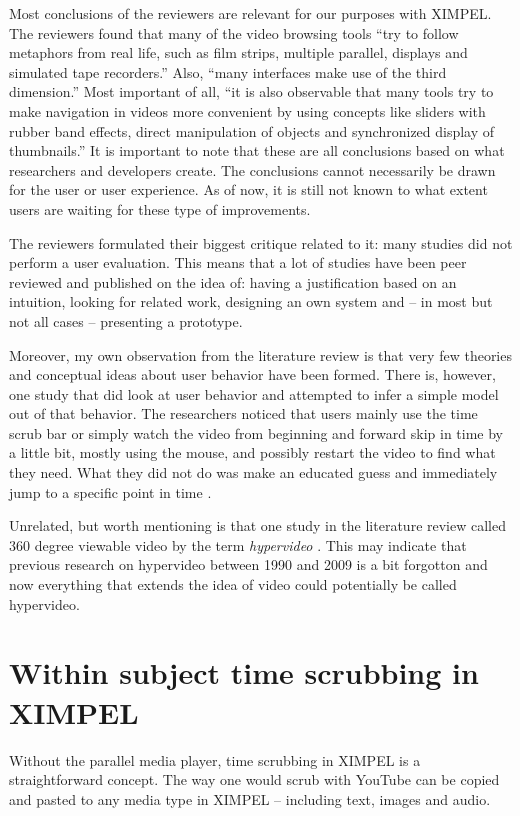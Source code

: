 Most conclusions of the reviewers are relevant for our purposes with XIMPEL. The reviewers found that many of the video browsing tools ``try to follow metaphors from real life, such as film strips, multiple parallel, displays and simulated tape recorders.'' Also, ``many interfaces make use of the third dimension.'' Most important of all, ``it is also observable that many tools try to make navigation in videos more convenient by using concepts like sliders with rubber band effects, direct manipulation of objects and synchronized display of thumbnails.'' \cite{schoeffmann2015} It is important to note that these are all conclusions based on what researchers and developers create. The conclusions cannot necessarily be drawn for the user or user experience. As of now, it is still not known to what extent users are waiting for these type of improvements. 

The reviewers formulated their biggest critique related to it: many studies did not perform a user evaluation. This means that a lot of studies have been peer reviewed and published on the idea of: having a justification based on an intuition, looking for related work, designing an own system and -- in most but not all cases -- presenting a prototype. 

Moreover, my own observation from the literature review is that very few theories and conceptual ideas about user behavior have been formed. There is, however, one study that did look at user behavior and attempted to infer a simple model out of that behavior. The researchers noticed that users mainly use the time scrub bar or simply watch the video from beginning and forward skip in time by a little bit, mostly using the mouse, and possibly restart the video to find what they need. What they did not do was make an educated guess and immediately jump to a specific point in time \cite{cobarzan2014}. 

Unrelated, but worth mentioning is that one study in the literature review called 360 degree viewable video by the term \textit{hypervideo} \cite{neng2010}. This may indicate that previous research on hypervideo between 1990 and 2009 is a bit forgotton and now everything that extends the idea of video could potentially be called hypervideo.

\section{Within subject time scrubbing in XIMPEL}
Without the parallel media player, time scrubbing in XIMPEL is a straightforward concept. The way one would scrub with YouTube can be copied and pasted to any media type in XIMPEL -- including text, images and audio. 



